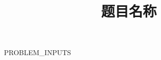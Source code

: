 \documentclass[withoutpreface,bwprint]{cumcmthesis}
\title{题目名称}
\begin{document}
\maketitle


{{PROBLEM_INPUTS}}




\end{document}
